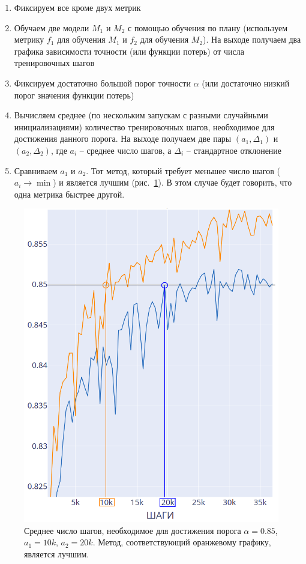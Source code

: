 \documentclass{spbau-diploma}
\begin{document}
\begin{enumerate}
	\item Фиксируем все кроме двух метрик
	\item Обучаем две модели $M_1$ и $M_2$ с помощью обучения по плану (используем метрику $f_1$ для обучения $M_1$ и $f_2$ для обучения $M_2$). На выходе получаем два графика зависимости точности (или функции потерь) от числа тренировочных шагов
	\item Фиксируем достаточно большой порог точности $\alpha$ (или достаточно низкий порог значения функции потерь)
	\item Вычисляем среднее (по нескольким запускам с разными случайными инициализациями) количество тренировочных шагов, необходимое для достижения данного порога. На выходе получаем две пары $(a_1,\Delta_1)$ и $(a_2,\Delta_2)$, где $a_i$ -- среднее число шагов, а $\Delta_i$ -- стандартное отклонение
	\item Сравниваем $a_1$ и $a_2$. Тот метод, который требует меньшее число шагов ($a_i \rightarrow \min$) и является лучшим (рис.~\ref{fig:metrics_compare}). В этом случае будет говорить, что одна метрика быстрее другой.
\end{enumerate}

\begin{figure}[h]
	\centering
	\includegraphics[scale=0.4]{compare}
	\caption{Среднее число шагов, необходимое для достижения порога $\alpha = 0.85$, $a_1 = 10k$, $a_2 = 20k$. Метод, соответствующий оранжевому графику, является лучшим.}
	\label{fig:metrics_compare}
\end{figure}
\end{document}
